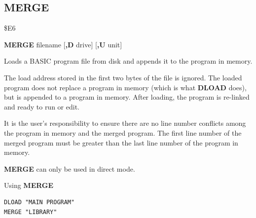 \subsection{MERGE}
\begin{description}[leftmargin=2cm,style=nextline]
\item [Token:]    \$E6

\item [Format:]   {\bf MERGE} filename [{\bf,D} drive] [{\bf,U} unit]

\item [Usage:]    Loads a BASIC program file from disk and appends it to the program in memory.

                  \filenamedefinition

                  \drivedefinition

                  \unitdefinition

\item [Remarks:]  The load address stored in the first two bytes of the file is ignored. The loaded program does not replace a program in memory (which is what {\bf DLOAD} does), but is appended to a program in memory. After loading, the program is re-linked and ready to run or edit.

                  It is the user's responsibility to ensure there are no line number conflicts among the program in memory and the merged program. The first line number of the merged program must be greater than the last line number of the program in memory.

                  {\bf MERGE} can only be used in direct mode.

\item [Example:]  Using {\bf MERGE}

\begin{tcolorbox}[colback=black,coltext=white]
\verbatimfont{\codefont}
\begin{verbatim}
DLOAD "MAIN PROGRAM"
MERGE "LIBRARY"
\end{verbatim}
\end{tcolorbox}
\end{description}


\newpage
